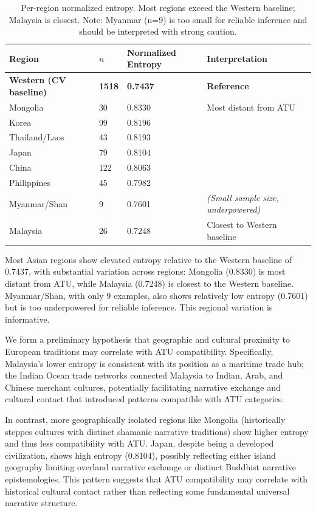 \documentclass{article}
\begin{document}
\begin{table}[h]
\centering
\small
\begin{tabular}{llll}
\toprule
\textbf{Region} & \textbf{$n$} & \textbf{Normalized Entropy} & \textbf{Interpretation} \\
\midrule
\textbf{Western (CV baseline)} & \textbf{1518} & \textbf{0.7437} & \textbf{Reference} \\
\midrule
Mongolia & 30 & 0.8330 & Most distant from ATU \\
Korea & 99 & 0.8196 &  \\
Thailand/Laos & 43 & 0.8193 &  \\
Japan & 79 & 0.8104 &  \\
China & 122 & 0.8063 &  \\
Philippines & 45 & 0.7982 &  \\
Myanmar/Shan & 9 & 0.7601 & \textit{(Small sample size, underpowered)} \\
Malaysia & 26 & 0.7248 & Closest to Western baseline \\
\bottomrule
\end{tabular}
\caption{Per-region normalized entropy. Most regions exceed the Western baseline; Malaysia is closest. Note: Myanmar (n=9) is too small for reliable inference and should be interpreted with strong caution.}
\label{tab:per_region}
\end{table}

Most Asian regions show elevated entropy relative to the Western baseline of 0.7437, with substantial variation across regions: Mongolia (0.8330) is most distant from ATU, while Malaysia (0.7248) is closest to the Western baseline. Myanmar/Shan, with only 9 examples, also shows relatively low entropy (0.7601) but is too underpowered for reliable inference. This regional variation is informative.

We form a preliminary hypothesis that geographic and cultural proximity to European traditions may correlate with ATU compatibility. Specifically, Malaysia's lower entropy is consistent with its position as a maritime trade hub; the Indian Ocean trade networks connected Malaysia to Indian, Arab, and Chinese merchant cultures, potentially facilitating narrative exchange and cultural contact that introduced patterns compatible with ATU categories.

In contrast, more geographically isolated regions like Mongolia (historically steppes cultures with distinct shamanic narrative traditions) show higher entropy and thus less compatibility with ATU. Japan, despite being a developed civilization, shows high entropy (0.8104), possibly reflecting either island geography limiting overland narrative exchange or distinct Buddhist narrative epistemologies. This pattern suggests that ATU compatibility may correlate with historical cultural contact rather than reflecting some fundamental universal narrative structure.
\end{document}
